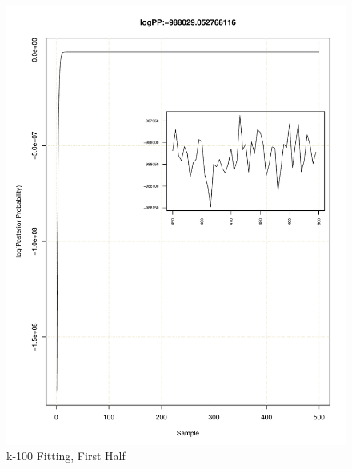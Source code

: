 \documentclass[11pt]{labbook}
\begin{document}
    \begin{figure}
        \centering
        \includegraphics[scale=.65]{FONSE_Plots/2016/December_14/k-100_loglike500}
        \caption{k-100 Fitting, First Half}
        \label{fig:k-100_1LIK}
    \end{figure}
\end{document}
